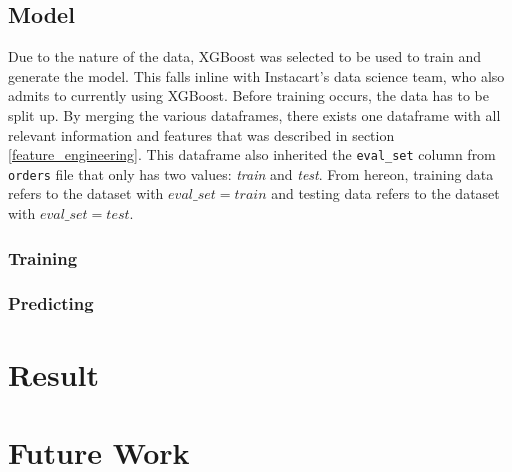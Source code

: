 \documentclass[12pt]{article}
\begin{document}
\subsection{Model}
Due to the nature of the data, XGBoost was selected to be used to train and generate the model. This falls inline with Instacart's data science team, who also admits to currently using XGBoost. 
\newline\newline
Before training occurs, the data has to be split up. By merging the various dataframes, there exists one dataframe with all relevant information and features that was described in section \ref{feature_engineering}. This dataframe also inherited the \texttt{eval\_set} column from \texttt{orders} file that only has two values: \textit{train} and \textit{test}. From hereon, training data refers to the dataset with $eval\_set = train$ and testing data refers to the dataset with $eval\_set = test$.

\subsubsection{Training}

\subsubsection{Predicting}

\section{Result}

\section{Future Work}
\end{document}
